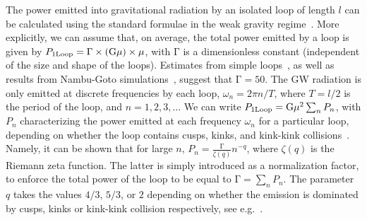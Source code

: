 \documentclass[11pt,a4paper]{article}
\begin{document}
The power emitted into gravitational radiation by an isolated loop of length $l$ can be calculated using the standard formulae in the weak gravity regime~\cite{Weinberg:1972kfs}. More explicitly, we can assume that, on average, the total power emitted by a loop is given by $P_{\rm 1Loop} = \Gamma \times (\mathrm{G} \mu) \times \mu$, with $\mathrm{\Gamma}$ is a dimensionless constant (independent of the size and shape of the loops). Estimates from simple loops~\cite{Vachaspati:1984gt,Burden:1985md,Garfinkle:1987yw}, as well as results from Nambu-Goto simulations~\cite{Blanco-Pillado:2017oxo}, suggest that $\mathrm{\Gamma}=50$. The GW radiation is only emitted at discrete frequencies by each loop, $\omega_n = 2\pi n/T$, where $T=l/2$ is the period of the loop, and $n=1,2,3,\ldots$ We can write $P_{\rm 1Loop} = \mathrm{G} \mu^2\sum_n P_n$, with $P_n$ characterizing the power emitted at each frequency $\omega_n$ for a particular loop, depending on whether the loop contains cusps, kinks, and kink-kink collisions~\cite{Burden:1985md,Allen:1991bk}. Namely, it can be shown that for large $n$,
$P_{ n}=\frac{\mathrm{\Gamma}}{\zeta(q)}n^{-q}$, where $\zeta(q)$ is the Riemann zeta function. The latter is simply introduced as a normalization factor, to enforce the total power of the loop to be equal to $\mathrm{\Gamma}=\sum_n P_n$. The parameter $q$ takes the values $4/3$,
$5/3$, or $2$ depending on whether the emission is dominated by cusps, kinks or kink-kink collision respectively, see e.g.~\cite{Vachaspati:1984gt,Binetruy:2009vt,Auclair:2019wcv}.
\end{document}
